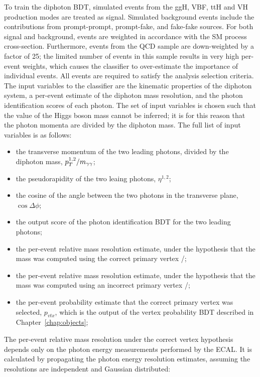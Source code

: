 To train the diphoton BDT, simulated events from the ggH, VBF, ttH 
and VH production modes are treated as signal. 
Simulated background events include the contributions from prompt-prompt, prompt-fake, 
and fake-fake sources.
For both signal and background, 
events are weighted in accordance with the SM process cross-section.
Furthermore, events from the QCD sample are down-weighted by a factor of 25;
the limited number of events in this sample results in very high per-event weights, 
which causes the classifier to over-estimate the importance of individual events.
All events are required to satisfy the analysis selection criteria.
The input variables to the classifier are the kinematic properties of the diphoton system, 
a per-event estimate of the diphoton mass resolution, 
and the photon identification scores of each photon.
The set of input variables is chosen such that the value of the Higgs boson mass cannot be inferred;
it is for this reason that the photon momenta are divided by the diphoton mass.
The full list of input variables is as follows:
\begin{itemize}
\item the transverse momentum of the two leading photons, divided by the diphoton mass, $p_T^{1,2}/m_{\gamma\gamma}$;
\item the pseudorapidity of the two leaing photons, $\eta^{1,2}$;
\item the cosine of the angle between the two photons in the transverse plane, $\cos{\Delta\phi}$;
\item the output score of the photon identification BDT for the two leading photons;
\item the per-event relative mass resolution estimate, 
      under the hypothesis that the mass was computed using the correct primary vertex \srv/\mgg;
\item the per-event relative mass resolution estimate, 
      under the hypothesis that the mass was computed using an incorrect primary vertex \swv/\mgg;
\item the per-event probability estimate that the correct primary vertex was selected, $p_{vtx}$,
      which is the output of the vertex probability BDT described in Chapter~\ref{chap:objects};
\end{itemize}

The per-event relative mass resolution under the correct vertex hypothesis 
depends only on the photon energy measurements performed by the ECAL.
It is calculated by propagating the photon energy resolution estimates, 
assuming the resolutions are independent and Gaussian distributed:

